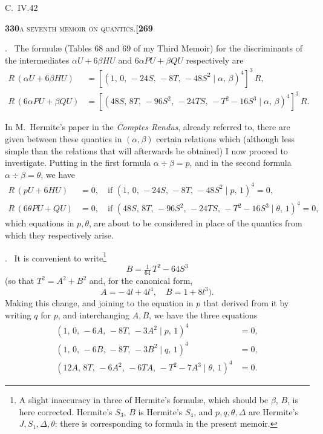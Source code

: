 \documentclass[11pt]{article}
\newcommand{\Cdel}{\mid}
\begin{document}
\hfill C.~IV.\hfill 42

\newpage
\setcounter{page}{330}

\noindent\textbf{330}\hfill\textsc{a seventh memoir on quantics.}\hfill\textbf{[269}

\medskip

. \ The formul\ae{} (Tables 68 and 69 of my Third Memoir) for the discriminants of the intermediates $\alpha U + 6\beta H U$ and $6\alpha P U + \beta Q U$ respectively are
\[
\begin{aligned}
   R\,(\alpha U + 6\beta H U) &= [(1,\,0,\,-24 S,\,-8 T,\,-48 S^2\Cdel\alpha,\,\beta)^4]^3\,R,\\
   R\,(6\alpha P U + \beta Q U) &= [(48 S,\,8 T,\,-96 S^2,\,-24 T S,\,-T^2 - 16 S^3\Cdel\alpha,\,\beta)^4]^3\,R.
\end{aligned}
\]

\medskip

\noindent In M.~Hermite's paper in the \textit{Comptes Rendus}, already referred to, there are given between these quantics in $(\alpha, \beta)$ certain relations which (although less simple than the relations that will afterwards be obtained) I now proceed to investigate. Putting in the first formula $\alpha\div\beta = p$, and in the second formula $\alpha\div\beta = \theta$, we have
\[
\begin{aligned}
   R\,(p U + 6 H U) &= 0,\quad\text{if } (1,\,0,\,-24 S,\,-8 T,\,-48 S^2\Cdel p,\,1)^4 = 0,\\
   R\,(6\theta P U + Q U) &= 0,\quad\text{if } (48 S,\,8 T,\,-96 S^2,\,-24 T S,\,-T^2 - 16 S^3\Cdel\theta,\,1)^4 = 0,
\end{aligned}
\]
which equations in $p, \theta$, are about to be considered in place of the quantics from which they respectively arise.

\medskip

. \ It is convenient to write\footnote{A slight inaccuracy in three of Hermite's formul\ae, which should be $\beta$, $B$, is here corrected. Hermite's $S_3$, $B$ is Hermite's $S_4$, and $p, q, \theta, \Delta$ are Hermite's $J, S_1, \Delta, \theta$: there is corresponding to formula in the present memoir.}
\[
   B = \tfrac{1}{64}\,T^2 - 64 S^3
\]
(so that $T^2 = A^2 + B^2$ and, for the canonical form,
\[
   A = -\,4 l + 4 l^4,\quad B = 1 + 8 l^3).
\]
Making this change, and joining to the equation in $p$ that derived from it by writing $q$ for $p$, and interchanging $A, B$, we have the three equations
\[
\begin{aligned}
   (1,\,0,\,-6 A,\,-8 T,\,-3 A^2\Cdel p,\,1)^4 &= 0,\\
   (1,\,0,\,-6 B,\,-8 T,\,-3 B^2\Cdel q,\,1)^4 &= 0,\\
   (12 A,\,8 T,\,-6 A^2,\,-6 T A,\,-T^2 - 7 A^3\Cdel\theta,\,1)^4 &= 0.
\end{aligned}
\]
\end{document}
